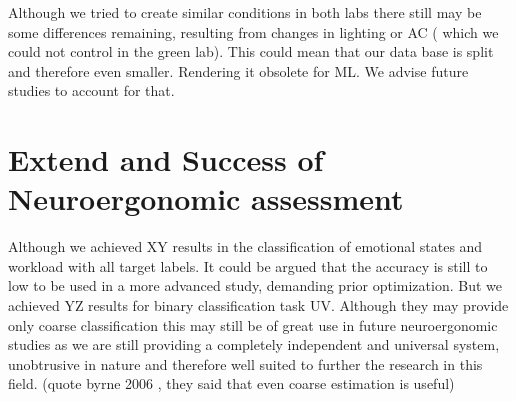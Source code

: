 Although we tried to create similar conditions in both labs there still may be some differences remaining, resulting from changes in lighting or AC ( which we could not control in the green lab). This could mean that our data base is split and therefore even smaller. Rendering it obsolete for ML. We advise future studies to account for that.

\section{Extend and Success of Neuroergonomic assessment}
Although we achieved XY results in the classification of emotional states and workload with all target labels. It could be argued that the accuracy is still to low to be used in a more advanced study, demanding prior optimization.
But we achieved YZ results for binary classification task UV. Although they may provide only coarse classification this may still be of great use in future neuroergonomic studies as we are still providing a completely independent and universal system, unobtrusive in nature and therefore well suited to further the research in this field. (quote byrne 2006 , they said that even coarse estimation is useful)
